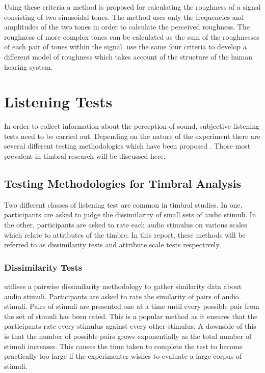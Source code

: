 		Using these criteria a method is proposed for calculating the roughness of a signal consisting of two
		sinusoidal tones. The method uses only the frequencies and amplitudes of the two tones in order to
		calculate the perceived roughness. The roughness of more complex tones can be calculated as the sum of the
		roughnesses of each pair of tones within the signal. \citet{fastl2007psychoacoustics} use the same four
		criteria to develop a different model of roughness which takes account of the structure of the human
		hearing system.

\section{Listening Tests}
\label{sec:Timbre-ListeningTests}
	In order to collect information about the perception of sound, subjective listening tests need to be carried out.
	Depending on the nature of the experiment there are several different testing methodologies which have been
	proposed \citep{bech2006perceptual}. Those most prevalent in timbral research will be discussed here.

	\subsection{Testing Methodologies for Timbral Analysis}
	\label{sec:Timbre-ListeningTests-Methods}
		Two different classes of listening test are common in timbral studies. In one, participants are asked to
		judge the dissimilarity of small sets of audio stimuli. In the other, participants are asked to rate each
		audio stimulus on various scales which relate to attributes of the timbre. In this report, these methods
		will be referred to as dissimilarity tests and attribute scale tests respectively.

		\subsubsection*{Dissimilarity Tests}
			\citet{grey1977multidimensional} utilises a pairwise dissimilarity methodology to gather similarity
			data about audio stimuli. Participants are asked to rate the similarity of pairs of audio stimuli.
			Pairs of stimuli are presented one at a time until every possible pair from the set of stimuli has
			been rated. This is a popular method as it ensures that the participants rate every stimulus
			against every other stimulus. A downside of this is that the number of possible pairs grows
			exponentially as the total number of stimuli increases. This causes the time taken to complete the
			test to become practically too large if the experimenter wishes to evaluate a large corpus of
			stimuli.


